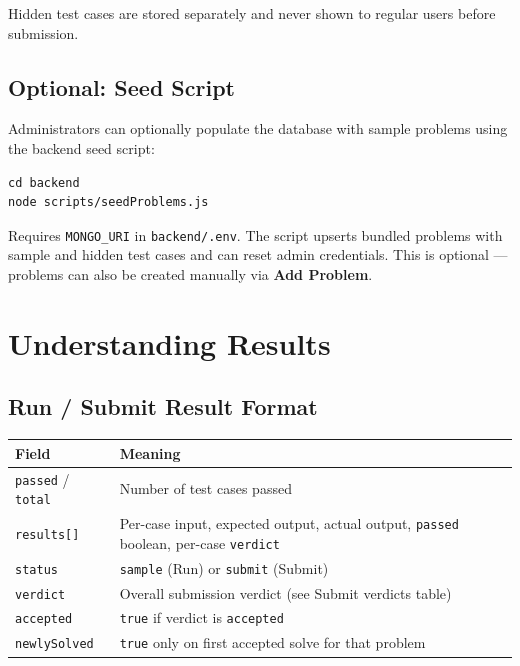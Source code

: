 \documentclass[11pt,a4paper]{article}
\begin{document}
Hidden test cases are stored separately and never shown to regular users before submission.

\subsection{Optional: Seed Script}
Administrators can optionally populate the database with sample problems using the backend seed script:

\begin{lstlisting}[style=terminal]
cd backend
node scripts/seedProblems.js
\end{lstlisting}

Requires \texttt{MONGO\_URI} in \texttt{backend/.env}. The script upserts bundled problems with sample and hidden test cases and can reset admin credentials. This is optional --- problems can also be created manually via \textbf{Add Problem}.

\section{Understanding Results}

\subsection{Run / Submit Result Format}
\begin{table}[h]
\centering
\small
\begin{tabular}{@{}lp{8.5cm}@{}}
\toprule
\textbf{Field} & \textbf{Meaning} \\
\midrule
\texttt{passed} / \texttt{total} & Number of test cases passed \\
\texttt{results[]} & Per-case input, expected output, actual output, \texttt{passed} boolean, per-case \texttt{verdict} \\
\texttt{status}   & \texttt{sample} (Run) or \texttt{submit} (Submit) \\
\texttt{verdict}  & Overall submission verdict (see Submit verdicts table) \\
\texttt{accepted} & \texttt{true} if verdict is \texttt{accepted} \\
\texttt{newlySolved} & \texttt{true} only on first accepted solve for that problem \\
\bottomrule
\end{tabular}
\end{table}
\end{document}
